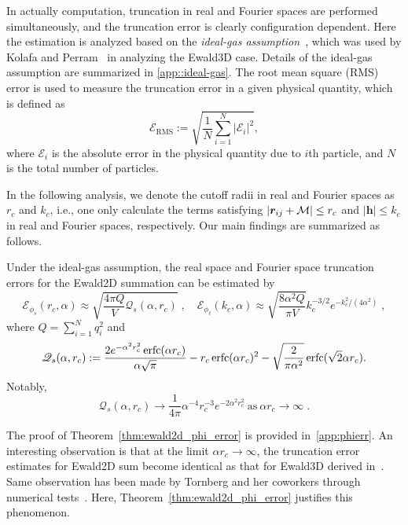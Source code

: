 In actually computation, truncation in real and Fourier spaces are performed simultaneously, and the truncation error is clearly configuration dependent.
Here the estimation is analyzed based on the \emph{ideal-gas assumption}~\cite{hansen2013theory}, which was used by Kolafa and Perram~\cite{kolafa1992cutoff} in analyzing the Ewald3D case. 
Details of the ideal-gas assumption are summarized in \ref{app::ideal-gas}.
The root mean square (RMS) error is used to measure the truncation error in a given physical quantity, which is defined as
\begin{equation}\label{RMS}
	\mathscr{E}_{\text{RMS}} := \sqrt{\frac{1}{N}\sum_{i=1}^{N}\left|\mathscr{E}_i\right|^2},
\end{equation}
where $\mathscr{E}_i$ is the absolute error in the physical quantity due to $i$th particle, and $N$ is the total number of particles.

In the following analysis, we denote the cutoff radii in real and Fourier spaces as $r_c$ and $k_c$, i.e., one only calculate the terms satisfying $\lvert\bm{r}_{ij} + \mathcal{M}\rvert \leq r_c$ and 
$|\bm{h }|\leq k_c$ in real and Fourier spaces, respectively.
Our main findings are summarized as follows. 

\begin{thm}\label{thm:ewald2d_phi_error}
	Under the ideal-gas assumption, the real space and Fourier space truncation errors for the Ewald2D summation can be estimated by
	\begin{equation}\label{eq::Ephi}
		\mathscr{E}_{\phi_s} (r_c, \alpha) \approx \sqrt{\frac{4\pi Q}{V}\mathscr{Q}_{s}(\alpha,r_c)}\;, \quad
		\mathscr{E}_{\phi_\ell} (k_c, \alpha) \approx \sqrt{\frac{8\alpha^2Q}{\pi V}}k_c^{-3/2}e^{-k_c^2/(4\alpha^2)}\;,
	\end{equation}
	where $Q = \sum_{i=1}^{N} q_{i}^2$ and
	\begin{equation}\label{eq::Qs2}
		\mathscr{Q}_{s}(\alpha,r_c):=\frac{2e^{-\alpha^2r_c^2}\operatorname{erfc}(\alpha r_c)}{\alpha\sqrt{\pi}}-r_c\operatorname{erfc}(\alpha r_c)^2-\sqrt{\frac{2}{\pi\alpha^2}}\operatorname{erfc}(\sqrt{2}\alpha r_c).
	\end{equation}
	Notably,
	\begin{equation}\label{eq::Qs}
		\mathscr{Q}_{s}(\alpha,r_c)\rightarrow\frac{1}{4\pi}\alpha^{-4} r_c^{-3}e^{-2\alpha^2r_c^2}~\text{as}~\alpha r_c\rightarrow \infty\;. 
	\end{equation}
\end{thm}
The proof of Theorem~\ref{thm:ewald2d_phi_error} is provided in~\ref{app:phierr}.
An interesting observation is that at the limit $\alpha r_c\rightarrow \infty$, the truncation error estimates for Ewald2D sum become identical as that for Ewald3D derived in~\cite{kolafa1992cutoff}.
Same observation has been made by Tornberg and her coworkers through numerical tests~\cite{lindbo2012fast,shamshirgar2021fast}. 
Here, Theorem~\ref{thm:ewald2d_phi_error} justifies this phenomenon.

